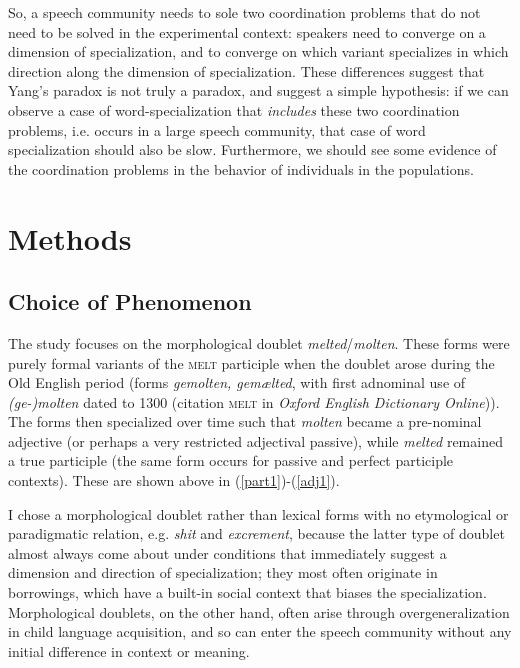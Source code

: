 \documentclass{artikel3}
\begin{document}
So, a speech community needs to sole two coordination problems that do not need to be solved in the experimental context: speakers need to converge on a dimension of specialization, and to converge on which variant specializes in which direction along the dimension of specialization. These differences suggest that Yang's paradox is not truly a paradox, and suggest a simple hypothesis: if we can observe a case of word-specialization that \textsl{includes} these two coordination problems, i.e. occurs in a large speech community, that case of word specialization should also be slow. Furthermore, we should see some evidence of the coordination problems in the behavior of individuals in the populations. 



\section{Methods}
\label{methods}

\subsection{Choice of Phenomenon}

The study focuses on the morphological doublet \textsl{melted}/\textsl{molten}. These forms were purely formal variants of the \textsc{melt} participle when the doublet arose during the Old English period (forms \textsl{gemolten, gemælted}, with first adnominal use of \textsl{(ge-)molten} dated to 1300 (citation \textsc{melt} in \textsl{Oxford English Dictionary Online})). The forms then specialized over time such that \textsl{molten} became a pre-nominal adjective (or perhaps a very restricted adjectival passive), while \textsl{melted} remained a true participle (the same form occurs for passive and perfect participle contexts). These are shown above in (\ref{part1})-(\ref{adj1}). 

I chose a morphological doublet rather than lexical forms with no etymological or paradigmatic relation, e.g. \textsl{shit} and \textsl{excrement}, because the latter type of doublet almost always come about under conditions that immediately suggest a dimension and direction of specialization; they most often originate in borrowings, which have a built-in social context that biases the specialization. Morphological doublets, on the other hand, often arise through overgeneralization in child language acquisition, and so can enter the speech community without any initial difference in context or meaning.
\end{document}
